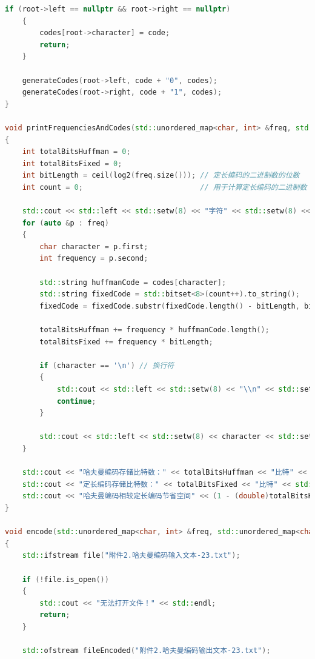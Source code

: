 \documentclass[lang=cn,11pt,a4paper]{elegantpaper}
\begin{document}
\begin{lstlisting}[language=c++]
    if (root->left == nullptr && root->right == nullptr)
    {
        codes[root->character] = code;
        return;
    }

    generateCodes(root->left, code + "0", codes);
    generateCodes(root->right, code + "1", codes);
}

void printFrequenciesAndCodes(std::unordered_map<char, int> &freq, std::unordered_map<char, std::string> &codes)
{
    int totalBitsHuffman = 0;
    int totalBitsFixed = 0;
    int bitLength = ceil(log2(freq.size())); // 定长编码的二进制数的位数
    int count = 0;                           // 用于计算定长编码的二进制数

    std::cout << std::left << std::setw(8) << "字符" << std::setw(8) << "频率" << std::setw(16) << "哈夫曼编码" << std::setw(16) << "定长编码" << std::endl;
    for (auto &p : freq)
    {
        char character = p.first;
        int frequency = p.second;
        
        std::string huffmanCode = codes[character];
        std::string fixedCode = std::bitset<8>(count++).to_string();
        fixedCode = fixedCode.substr(fixedCode.length() - bitLength, bitLength);

        totalBitsHuffman += frequency * huffmanCode.length();
        totalBitsFixed += frequency * bitLength;

        if (character == '\n') // 换行符
        {
            std::cout << std::left << std::setw(8) << "\\n" << std::setw(8) << frequency << std::setw(16) << huffmanCode << std::setw(16) << fixedCode << std::endl;
            continue;
        }

        std::cout << std::left << std::setw(8) << character << std::setw(8) << frequency << std::setw(16) << huffmanCode << std::setw(16) << fixedCode << std::endl;
    }

    std::cout << "哈夫曼编码存储比特数：" << totalBitsHuffman << "比特" << std::endl;
    std::cout << "定长编码存储比特数：" << totalBitsFixed << "比特" << std::endl;
    std::cout << "哈夫曼编码相较定长编码节省空间" << (1 - (double)totalBitsHuffman / totalBitsFixed) * 100 << "%" << std::endl;
}

void encode(std::unordered_map<char, int> &freq, std::unordered_map<char, std::string> &codes)
{
    std::ifstream file("附件2.哈夫曼编码输入文本-23.txt");

    if (!file.is_open())
    {
        std::cout << "无法打开文件！" << std::endl;
        return;
    }

    std::ofstream fileEncoded("附件2.哈夫曼编码输出文本-23.txt");


\end{lstlisting}
\end{document}
